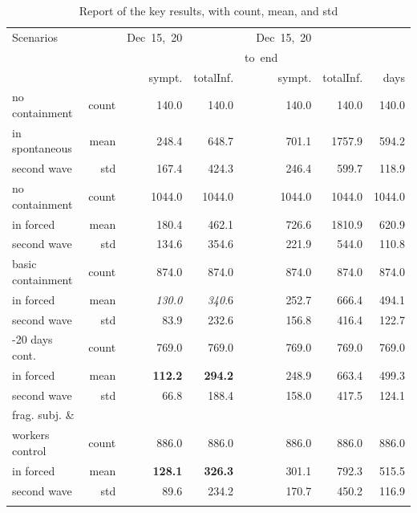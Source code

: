 \documentclass[graybox]{svmult}
\begin{document}
\begin{table}[t]
\center
\footnotesize
\begin{tabular}{lrrrrrr}
\hline\noalign{\smallskip}
Scenarios & & Dec~15,~20 & & Dec~15,~20\\
& & & & to~end~~~~~~ \\
 & & sympt. & totalInf. & sympt. & totalInf. & days \\ 

\noalign{\smallskip}\svhline\noalign{\smallskip}

no containment & count & 140.0 & 140.0 & 140.0 & 140.0 & 140.0 \\
in spontaneous & mean & 248.4 & 648.7 & 701.1 & 1757.9 & 594.2 \\
second wave & std & 167.4 & 424.3 & 246.4 & 599.7 & 118.9 \\

\hline\noalign{\smallskip}
no containment & count & 1044.0 & 1044.0 & 1044.0 & 1044.0 & 1044.0 \\
in forced & mean & 180.4 & 462.1 & 726.6 & 1810.9 & 620.9 \\
second wave & std & 134.6 & 354.6 & 221.9 & 544.0 & 110.8 \\

\hline\noalign{\smallskip}
basic containment & count & 874.0 & 874.0 & 874.0 & 874.0 & 874.0 \\
in forced & mean & \emph{130.0} & \emph{340}.6 & 252.7 & 666.4 & 494.1 \\
second wave & std & 83.9 & 232.6 & 156.8 & 416.4 & 122.7 \\
 
\hline\noalign{\smallskip}
-20 days cont. & count & 769.0 & 769.0 & 769.0 & 769.0 & 769.0 \\
in forced & mean & \textbf{{\color{red}112.2}} & \textbf{{\color{red} 294.2}} & 248.9 & 663.4 & 499.3 \\
second wave & std & 66.8 & 188.4 & 158.0 & 417.5 & 124.1 \\

\hline\noalign{\smallskip}
frag. subj. \& \\ 
workers control & count & 886.0 & 886.0 & 886.0 & 886.0 & 886.0 \\
in forced & mean & \textbf{{\color{violet}128.1}} & \textbf{{\color{violet}326.3}} & 301.1 & 792.3 & 515.5 \\
second wave & std & 89.6 & 234.2 & 170.7 & 450.2 & 116.9 \\


\hline\noalign{\smallskip}
\end{tabular}
\caption{Report of the key results, with count, mean, and std}
\label{keyResultsT}
\end{table}
\end{document}
